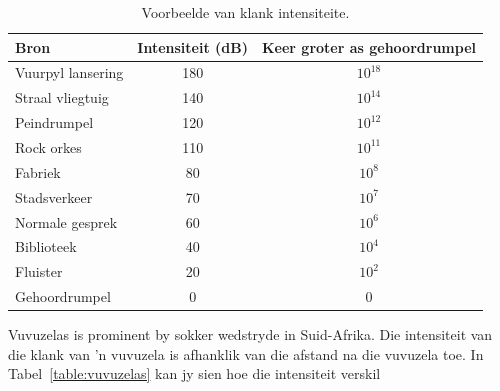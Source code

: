 \begin{table}[H]
\begin{center}
\begin{tabular}{|l|c|c|}\hline
\textbf{Bron}&\textbf{Intensiteit} (dB) & \textbf{Keer groter as gehoordrumpel}\\\hline
Vuurpyl lansering &180 & $10^{18}$\\
Straal vliegtuig & 140 & $10^{14}$ \\
Peindrumpel & 120 & $10^{12}$\\
Rock orkes & 110 & $10^{11}$\\
Fabriek & 80 & $10^{8}$\\
Stadsverkeer & 70 & $10^{7}$\\
Normale gesprek & 60 & $10^{6}$\\
Biblioteek & 40 & $10^{4}$\\
Fluister & 20 & $10^{2}$\\
Gehoordrumpel & 0 & 0\\
\hline
\end{tabular}
\end{center}
\caption{Voorbeelde van klank intensiteite.}
\label{p:wsl:s11:intensity}
\end{table}

Vuvuzelas is prominent by sokker wedstryde in Suid-Afrika. Die intensiteit van die klank van 'n vuvuzela is afhanklik van die afstand na die vuvuzela toe. In Tabel~\ref{table:vuvuzelas} kan jy sien hoe die intensiteit verskil

